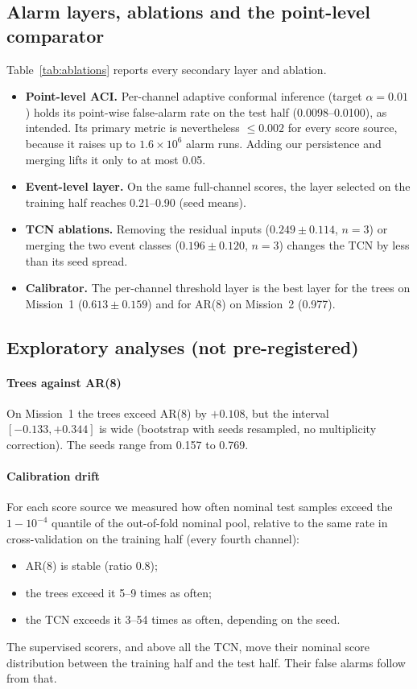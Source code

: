 \documentclass[preprint,12pt,authoryear]{elsarticle}
\begin{document}
\subsection{Alarm layers, ablations and the point-level comparator}
Table~\ref{tab:ablations} reports every secondary layer and ablation.
\begin{itemize}
\item \textbf{Point-level ACI.} Per-channel adaptive conformal inference (target
  $\alpha=0.01$) holds its point-wise false-alarm rate on the test half (0.0098--0.0100),
  as intended. Its primary metric is nevertheless $\le0.002$ for every score source, because it
  raises up to $1.6\times10^6$ alarm runs. Adding our persistence and merging lifts it only to
  at most 0.05.
\item \textbf{Event-level layer.} On the same full-channel scores, the layer selected on
  the training half reaches 0.21--0.90 (seed means).
\item \textbf{TCN ablations.} Removing the residual inputs ($0.249\pm0.114$, $n=3$) or
  merging the two event classes ($0.196\pm0.120$, $n=3$) changes the TCN by less than its
  seed spread.
\item \textbf{Calibrator.} The per-channel threshold layer is the best layer for the trees on
  Mission~1 ($0.613\pm0.159$) and for AR(8) on Mission~2 (0.977).
\end{itemize}

\subsection{Exploratory analyses (not pre-registered)}
\paragraph{Trees against AR(8)}
On Mission~1 the trees exceed AR(8) by $+0.108$, but the interval $[-0.133,+0.344]$ is wide
(bootstrap with seeds resampled, no multiplicity correction). The seeds range from 0.157 to
0.769.

\paragraph{Calibration drift}
For each score source we measured how often nominal test samples exceed the
$1-10^{-4}$ quantile of the out-of-fold nominal pool, relative to the same rate in
cross-validation on the training half (every fourth channel):
\begin{itemize}
\item AR(8) is stable (ratio 0.8);
\item the trees exceed it 5--9 times as often;
\item the TCN exceeds it 3--54 times as often, depending on the seed.
\end{itemize}
The supervised scorers, and above all the TCN, move their nominal score distribution
between the training half and the test half. Their false alarms follow from that.
\end{document}

